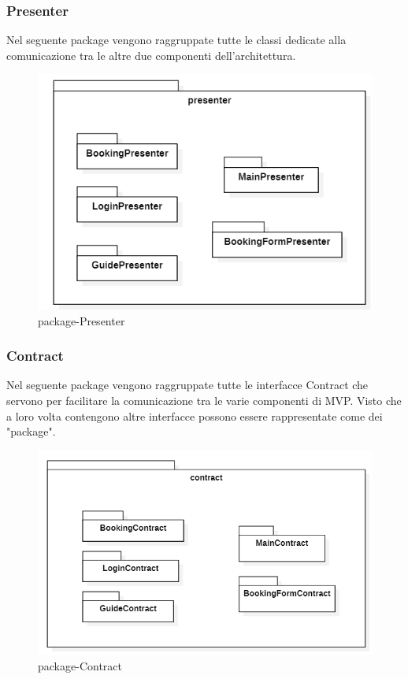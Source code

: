 \subsubsection{Presenter}
Nel seguente package vengono raggruppate tutte le classi dedicate alla comunicazione tra le altre due componenti dell'architettura.
\begin{figure}[H]
	\centering
	\includegraphics[width=16cm]{res/images/apputenti-packagePresenter.png}
	\caption{package-Presenter}
	\label{fig:package-Presenter}
\end{figure}

\subsubsection{Contract}
Nel seguente package vengono raggruppate tutte le interfacce Contract che servono per facilitare la comunicazione tra le varie componenti di MVP. Visto che a loro volta contengono altre interfacce possono essere rappresentate come dei "package".
\begin{figure}[H]
	\centering
	\includegraphics[width=16cm]{res/images/apputenti-packageContract.png}
	\caption{package-Contract}
	\label{fig:package-Contract}
\end{figure}

